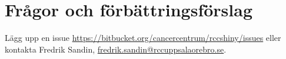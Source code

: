 \documentclass[12pt, a4paper,twoside]{report}
\begin{document}
\section{Frågor och förbättringsförslag}
Lägg upp en issue \url{https://bitbucket.org/cancercentrum/rccshiny/issues} eller kontakta Fredrik Sandin, \href{mailto:fredrik.sandin@rccuppsalaorebro.se}{fredrik.sandin@rccuppsalaorebro.se}.
\end{document}
